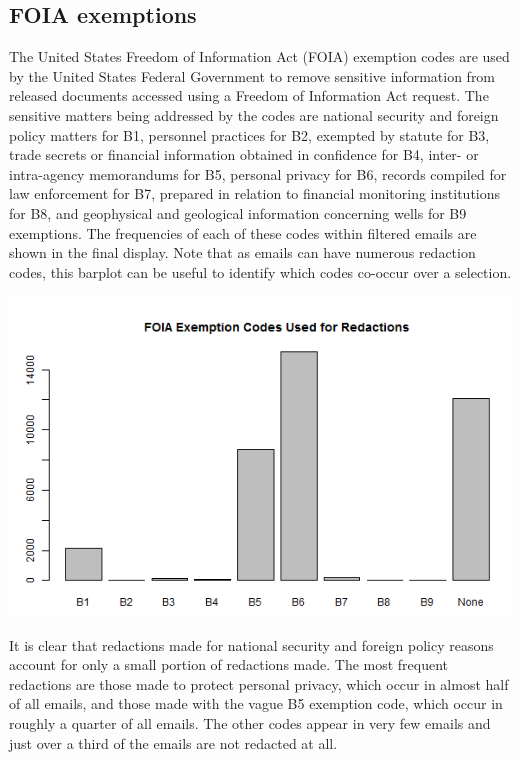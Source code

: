 \documentclass[journal]{vgtc}                %
\begin{document}
\subsection{FOIA exemptions}
\label{sect:Displays:FOIA}
The United States Freedom of Information Act (FOIA) exemption codes \cite{FOIA} are used by the United States Federal Government to remove sensitive information from released documents accessed using a Freedom of Information Act request. The sensitive matters being addressed by the codes are national security and foreign policy matters for B1, personnel practices for B2, exempted by statute for B3, trade secrets or financial information obtained in confidence for B4, inter- or intra-agency memorandums for B5, personal privacy for B6, records compiled for law enforcement for B7, prepared in relation to financial monitoring institutions for B8, and geophysical and geological information concerning wells for B9 exemptions. The frequencies of each of these codes within filtered emails are shown in the final display. Note that as emails can have numerous redaction codes, this barplot can be useful to identify which codes co-occur over a selection.
\begin{center}
\includegraphics[width=0.95\linewidth]{ExemptionsFullTime}
\end{center}

It is clear that redactions made for national security and foreign policy reasons account for only a small portion of redactions made. The most frequent redactions are those made to protect personal privacy, which occur in almost half of all emails, and those made with the vague B5 exemption code, which occur in roughly a quarter of all emails. The other codes appear in very few emails and just over a third of the emails are not redacted at all.
\end{document}

